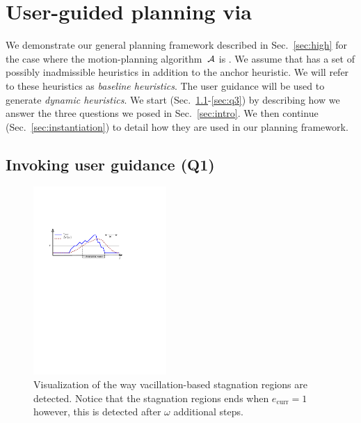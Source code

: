 \documentclass{article}
\begin{document}
\section{User-guided planning via \mhastar}
\label{sec:planning}

We demonstrate our general planning framework described in Sec.~\ref{sec:high} for the case where the motion-planning algorithm~$\mathcal{A}$ is  \mhastar.
We assume that \mhastar has a set of possibly inadmissible heuristics in addition to the anchor heuristic. We will refer to these heuristics as \emph{baseline heuristics}.
The user guidance will be used to generate \emph{dynamic heuristics}.
We start (Sec.~\ref{sec:q1}-\ref{sec:q3}) by describing how we answer the three questions we posed in Sec.~\ref{sec:intro}.
We then continue (Sec.~\ref{sec:instantiation}) to detail how they are used in our planning framework.

\subsection{Invoking user guidance (Q1)}
\label{sec:q1}

\begin{figure}
  \centering
  \includegraphics[width=0.45\textwidth]{fig/local_min_detection_new2.pdf}
	\vspace{-3mm}

  \caption{%
    Visualization of the way vacillation-based stagnation regions are detected.  
    Notice that the stagnation regions ends when $e_{\text{curr}} = 1$ however, this is detected after $\omega$ additional steps.}

	\vspace{-3mm}
  \label{fig:filmstrip-local-min}%
\end{figure}
\end{document}
